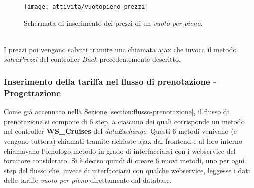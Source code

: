 \begin{figure}[!h] 
	\centering 
	\texttt{[image: attivita/vuotopieno\_prezzi]} 
	\caption{Schermata di inserimento dei prezzi di un \textit{vuoto per pieno}.}
	\label{figura:inserimento-prezzi-vuotopieno}
\end{figure}\\
I prezzi poi vengono salvati tramite una chiamata \gls{ajax} che invoca il metodo \textit{salvaPrezzi} del controller \textit{Back} precedentemente descritto.

\subsubsection{Inserimento della tariffa nel flusso di prenotazione - Progettazione}
Come già accennato nella \hyperref[section:flusso-prenotazione]{Sezione \ref*{section:flusso-prenotazione}}, il flusso di prenotazione si compone di 6 step, a ciascuno dei quali corrisponde un metodo nel controller \textbf{WS\_Cruises} del \textit{dataExchange}. Questi 6 metodi venivano (e vengono tuttora) chiamati tramite richieste \gls{ajax} dal frontend e al loro interno chiamavano l'omologo metodo in grado di interfacciarsi con i \gls{webservice} del fornitore considerato. Si è deciso quindi di creare 6 nuovi metodi, uno per ogni step del flusso che, invece di interfacciarsi con qualche \gls{webservice}, leggesse i dati delle tariffe \textit{vuoto per pieno} direttamente dal database.\\
